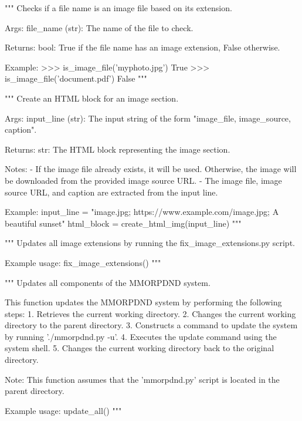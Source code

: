\begin{codebox}
"""
Checks if a file name is an image file based on its extension.

Args:
    file_name (str): The name of the file to check.

Returns:
    bool: True if the file name has an image extension, False otherwise.

Example:
    >>> is_image_file('myphoto.jpg')
    True
    >>> is_image_file('document.pdf')
    False
"""
\end{codebox}

\begin{codebox}
"""
Create an HTML block for an image section.

Args:
    input_line (str): The input string of the form "image_file, image_source, caption".

Returns:
    str: The HTML block representing the image section.

Notes:
    - If the image file already exists, it will be used. Otherwise, the image will be downloaded from the provided image source URL.
    - The image file, image source URL, and caption are extracted from the input line.

Example:
    input_line = "image.jpg; https://www.example.com/image.jpg; A beautiful sunset"
    html_block = create_html_img(input_line)
"""
\end{codebox}

\begin{codebox}
"""
Updates all image extensions by running the fix_image_extensions.py script.

Example usage:
   	fix_image_extensions()
"""
\end{codebox}

\begin{codebox}
"""
Updates all components of the MMORPDND system.

This function updates the MMORPDND system by performing the following steps:
	1. Retrieves the current working directory.
	2. Changes the current working directory to the parent directory.
	3. Constructs a command to update the system by running './mmorpdnd.py -u'.
	4. Executes the update command using the system shell.
	5. Changes the current working directory back to the original directory.

Note: This function assumes that the 'mmorpdnd.py' script is located in the parent directory.

Example usage:
	update_all()
"""
\end{codebox}

